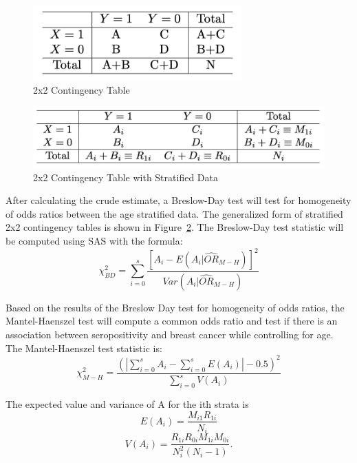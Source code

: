\documentclass[12pt, titlepage]{article}
\begin{document}
\begin{figure}[tbp]
  \centering
  \includegraphics[width=8cm]{table.png}
  \caption{2x2 Contingency Table}
  \label{fig:table}
\end{figure}

\begin{figure}[tbp]
  \centering
  \includegraphics[width=12cm]{2x2 stratified table.png}
  \caption{2x2 Contingency Table with Stratified Data}
  \label{fig:strat}
\end{figure}



After calculating the crude estimate, a Breslow-Day test will test for 
homogeneity of odds ratios between the age stratified data. The generalized
form of stratified 2x2 contingency tables is shown in Figure~\ref{fig:strat}.
The Breslow-Day test statistic will be computed using SAS with the formula:
\begin{equation}
  \chi_{BD}^2=\displaystyle\sum\limits_{i=0}^s\frac{[A_i-E(A_i|\hat{OR}_{M-H})]^2}{Var(A_i|\hat{OR}_{M-H})}
\end{equation}

Based on the results of the Breslow Day test for homogeneity of odds ratios,
the Mantel-Haenszel test will compute a common odds ratio and test if there 
is an association between seropositivity and breast cancer while controlling 
for age. The Mantel-Haenszel test statistic is:
\begin{equation}
  \chi_{M-H}^2=\frac{(|\sum\limits_{i=0}^s A_i - \sum\limits_{i=0}^sE(A_i)|-0.5)^2}
{\sum\limits_{i=0}^s V(A_i)}
\end{equation}

\vspace{1cm}

The expected value and variance of A for the ith strata is 
\[
  E(A_{i})=\frac{M_{i1}R_{1i}}{N_{i}} 
\]
\[
  V(A_{i})=\frac{R_{1i}R_{0i}M_{1i}M_{0i}}{N_i^2(N_{i}-1)}. 
\]
\end{document}

